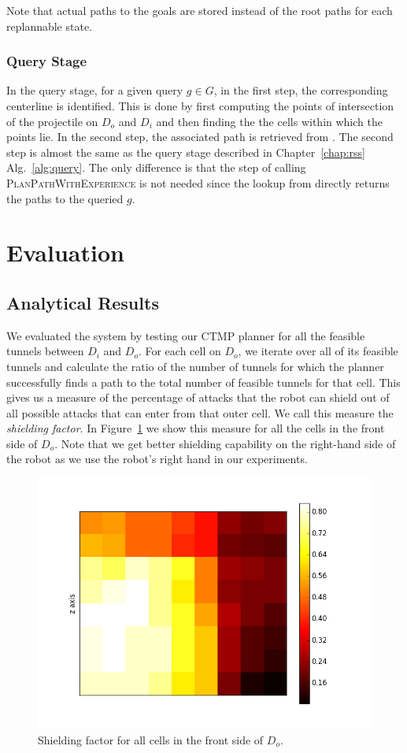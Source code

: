 \documentclass[a4paper]{report}
\begin{document}
Note that actual paths to the goals are stored instead of the root paths for each replannable state.

\subsubsection{Query Stage}
In the query stage, for a given query $g \in G$, in the first step, the corresponding centerline is identified. This is done by first computing the points of intersection of the projectile on $D_o$ and $D_i$ and then finding the the cells within which the points lie. In the second step, the associated path is retrieved from \calM.
The second step is almost the same as the query stage described in Chapter~\ref{chap:rss} Alg.~\ref{alg:query}. The only difference is that the step of calling \textsc{PlanPathWithExperience} is not needed since the lookup from \calM directly returns the paths to the queried $g$.

\section{Evaluation}
\subsection{Analytical Results}
We evaluated the system by testing our CTMP planner for all the feasible tunnels between $D_i$ and $D_o$. For each cell on $D_o$, we iterate over all of its feasible tunnels and calculate the ratio of the number of tunnels for which the planner successfully finds a path to the total number of feasible tunnels for that cell. This gives us a measure of the percentage of attacks that the robot can shield out of all possible attacks that can enter from that outer cell. We call this measure the \emph{shielding factor}. In Figure~\ref{fig:coverage_front} we show this measure for all the cells in the front side of $D_o$. Note that we get better shielding capability on the right-hand side of the robot as we use the robot's right hand in our experiments.

\begin{figure}[ht]
\centering
 \includegraphics[width=0.8\columnwidth]{heatmap1}
\caption{Shielding factor for all cells in the front side of $D_o$.}
\label{fig:coverage_front}
\end{figure}
\end{document}
